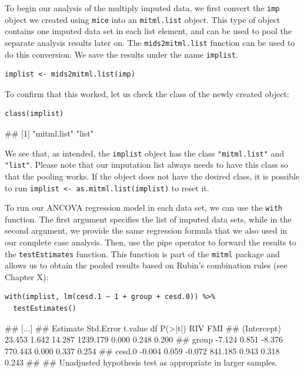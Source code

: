 To begin our analysis of the multiply imputed data, we first convert the \texttt{imp} object we created using \texttt{mice} into an \texttt{mitml.list} object. This type of object contains one imputed data set in each list element, and can be used to pool the separate analysis results later on. The \texttt{mids2mitml.list} function can be used to do this conversion. We save the results under the name \texttt{implist}. 

\begin{lstlisting}
implist <- mids2mitml.list(imp)
\end{lstlisting}

To confirm that this worked, let us check the class of the newly created object:

\begin{lstlisting}
class(implist)
\end{lstlisting}

\begin{example}
## [1] "mitml.list" "list"  
\end{example}

We see that, as intended, the \texttt{implist} object has the class \texttt{"mitml.list"} and \texttt{"list"}. Please note that our imputation list always needs to have this class so that the pooling works. If the object does not have the desired class, it is possible to run \texttt{implist <- as.mitml.list(implist)} to reset it. 

To run our ANCOVA regression model in each data set, we can use the \texttt{with} function. The first argument specifies the list of imputed data sets, while in the second argument, we provide the same regression formula that we also used in our complete case analysis. Then, use the pipe operator to forward the results to the \texttt{testEstimates} function. This function is part of the \texttt{mitml} package and allows us to obtain the pooled results based on Rubin's combination rules (see Chapter X):

\begin{lstlisting}
with(implist, lm(cesd.1 ~ 1 + group + cesd.0)) %>%
  testEstimates()
\end{lstlisting}

\begin{example}
## [...]
##              Estimate Std.Error  t.value        df  P(>|t|)    RIV    FMI 
## (Intercept)    23.453     1.642   14.287  1239.179    0.000  0.248  0.200 
## group          -7.124     0.851   -8.376   770.443    0.000  0.337  0.254 
## cesd.0         -0.004     0.059   -0.072   841.185    0.943  0.318  0.243 
## 
## Unadjusted hypothesis test as appropriate in larger samples.
\end{example}

